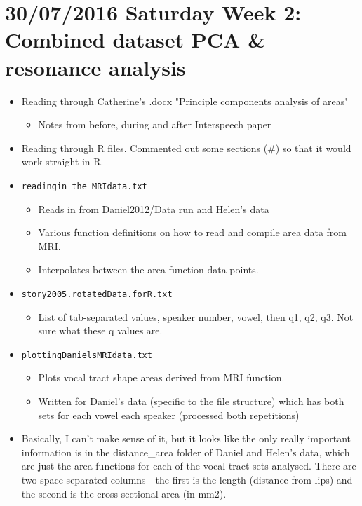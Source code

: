 \documentclass{article}
\begin{document}
\section*{30/07/2016 Saturday Week 2: Combined dataset PCA \& resonance analysis}
\begin{itemize}
    \item Reading through Catherine's .docx "Principle components analysis of areas"
    \begin{itemize}
        \item Notes from before, during and after Interspeech paper
    \end{itemize}
    \item Reading through R files. Commented out some sections (\#) so that it would work straight in R.
    \item \verb|readingin the MRIdata.txt|
    \begin{itemize}
        \item Reads in from Daniel2012/Data run and Helen's data
        \item Various function definitions on how to read and compile area data from MRI.
        \item Interpolates between the area function data points.
    \end{itemize}
    \item \verb|story2005.rotatedData.forR.txt|
    \begin{itemize}
        \item List of tab-separated values, speaker number, vowel, then q1, q2, q3. Not sure what these q values are.
    \end{itemize}
    \item \verb|plottingDanielsMRIdata.txt|
    \begin{itemize}
        \item Plots vocal tract shape areas derived from MRI function.
        \item Written for Daniel's data (specific to the file structure) which has both sets for each vowel each speaker (processed both repetitions)
    \end{itemize}
    \item Basically, I can't make sense of it, but it looks like the only really important information is in the distance\_area folder of Daniel and Helen's data, which are just the area functions for each of the vocal tract sets analysed. There are two space-separated columns - the first is the length (distance from lips) and the second is the cross-sectional area (in mm2).

\end{itemize}
\end{document}
